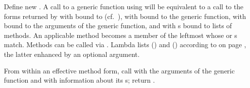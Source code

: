 \begin{LIST}{1cm}
  {
     Define new 
    . A call to a generic function using
     will be equivalent to a call to the forms returned by
     with  bound to
     (cf.\ ), with  bound to
    the generic function, with 
    bound to the arguments of the generic function, and with
    s bound to lists of methods. An applicable method becomes
    a member of the leftmost  whose  or
    s match. Methods can be called via
    . Lambda lists () and
    () according to
     on page \pageref{section:函数}, the latter
    enhanced by an optional  argument.
  }

  {
    From within an effective method form, call  with the
    arguments of the generic function and
    with information about its s; return . 
  }

\end{LIST}



